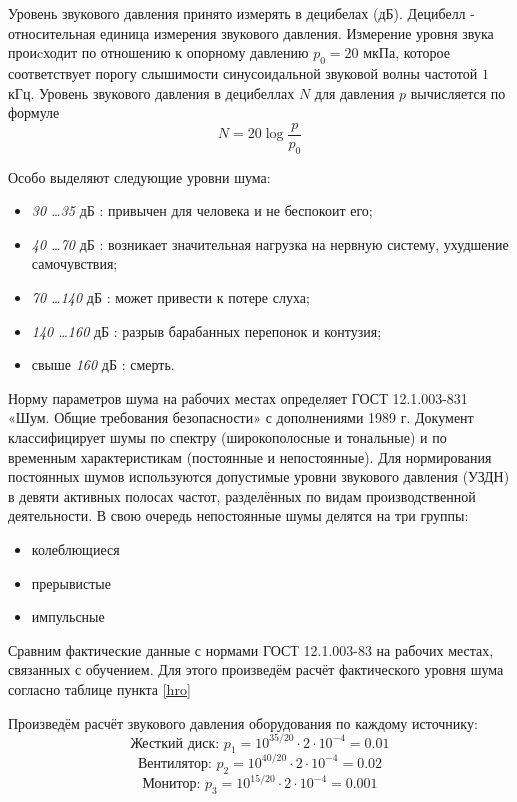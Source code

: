 Уровень звукового давления принято измерять в децибелах (дБ). Децибелл - отно\-сительная единица измерения звукового давления. Измерение уровня звука проиcходит по отношению к опорному давлению $p_0=20$ мкПа, которое соответствует порогу слы\-шимости синусоидальной звуковой волны частотой $1$ кГц. Уровень звукового давления в децибеллах $N$ для давления $p$ вычисляется по формуле
$$
N = 20 \log \frac{p}{p_0}
$$

Особо выделяют следующие уровни шума:
\begin{itemize}
\item {\itshape 30 \ldots 35} дБ : привычен для человека и не беспокоит его;
\item {\itshape 40 \ldots 70} дБ : возникает значительная нагрузка на нервную систему, ухудшение самочувствия;
\item {\itshape 70 \ldots 140} дБ : может привести к потере слуха;
\item {\itshape 140 \ldots 160} дБ : разрыв барабанных перепонок и контузия;
\item свыше {\itshape  160} дБ : смерть.
\end{itemize}

Норму параметров шума на рабочих местах определяет ГОСТ 12.1.003-831 «Шум. Общие требования безопасности» с дополнениями 1989 г. Документ классифицирует шумы по спектру (широкополосные и тональные) и по временным характеристикам (постоянные и непостоянные). Для нормирования постоянных шумов используются допустимые уровни звукового давления (УЗДН) в девяти активных полосах частот, разделённых по видам производственной деятельности. В свою очередь непостоянные шумы делятся на три груп\-пы:

\begin{itemize}
\item колеблющиеся
\item прерывистые
\item импульсные
\end{itemize}

Сравним фактические данные с нормами ГОСТ 12.1.003-83 на рабочих местах, связа\-нных с обучением. Для этого произведём расчёт фактического уровня шума согласно таблице пункта \ref{hro}

Произведём расчёт звукового давления оборудования по каждому источнику:
$$
\mbox{Жесткий диск: } p_1= 10^{35/20}\cdot 2 \cdot 10^{-4} = 0.01
$$
$$
\mbox{Вентилятор: } p_2= 10^{40/20}\cdot 2 \cdot 10^{-4} = 0.02
$$
$$
\mbox{Монитор: } p_3= 10^{15/20}\cdot 2 \cdot 10^{-4} = 0.001
$$

